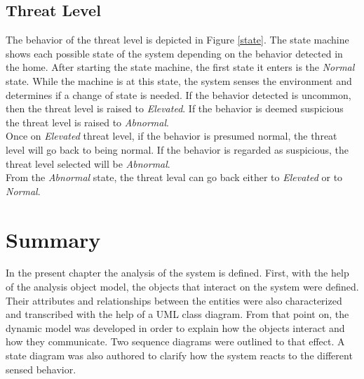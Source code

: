 \subsection{Threat Level}

The behavior of the threat level is depicted in Figure \ref{state}. The state machine shows each possible state of the system depending on the behavior detected in the home. After starting the state machine, the first state it enters is the \textit{Normal} state. While the machine is at this state, the system senses the environment and determines if a change of state is needed. If the behavior detected is uncommon, then the threat level is raised to \textit{Elevated}. If the behavior is deemed suspicious the threat level is raised to \textit{Abnormal}.
\\
Once on \textit{Elevated} threat level, if the behavior is presumed normal, the threat level will go back to being normal. If the behavior is regarded as suspicious, the threat level selected will be \textit{Abnormal}.
\\
From the \textit{Abnormal} state, the threat leval can go back either to \textit{Elevated} or to \textit{Normal}.

\section{Summary}
In the present chapter the analysis of the system is defined. First, with the help of the analysis object model, the objects that interact on the system were defined. Their attributes and relationships between the entities were also characterized and transcribed with the help of a UML class diagram. From that point on, the dynamic model was developed in order to explain how the objects interact and how they communicate. Two sequence diagrams were outlined to that effect. A state diagram was also authored to clarify how the system reacts to the different sensed behavior. 